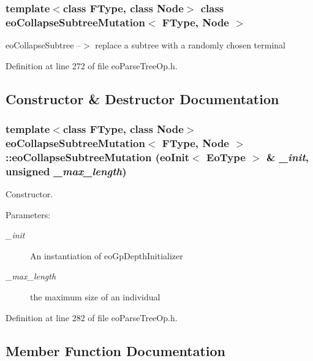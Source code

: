 \subsubsection*{template$<$class FType, class Node$>$ class eo\-Collapse\-Subtree\-Mutation$<$ FType, Node $>$}

eo\-Collapse\-Subtree --$>$ replace a subtree with a randomly chosen terminal 



Definition at line 272 of file eo\-Parse\-Tree\-Op.h.

\subsection{Constructor \& Destructor Documentation}
\subsubsection{\setlength{\rightskip}{0pt plus 5cm}template$<$class FType, class Node$>$ {\bf eo\-Collapse\-Subtree\-Mutation}$<$ FType, Node $>$::{\bf eo\-Collapse\-Subtree\-Mutation} ({\bf eo\-Init}$<$ {\bf Eo\-Type} $>$ \& {\em \_\-init}, unsigned {\em \_\-max\_\-length})\hspace{0.3cm}{\tt  [inline]}}\label{classeo_collapse_subtree_mutation_a0}


Constructor. 

\begin{Desc}
\item[Parameters:]
\begin{description}
\item[{\em \_\-init}]An instantiation of eo\-Gp\-Depth\-Initializer \item[{\em \_\-max\_\-length}]the maximum size of an individual \end{description}
\end{Desc}


Definition at line 282 of file eo\-Parse\-Tree\-Op.h.

\subsection{Member Function Documentation}
